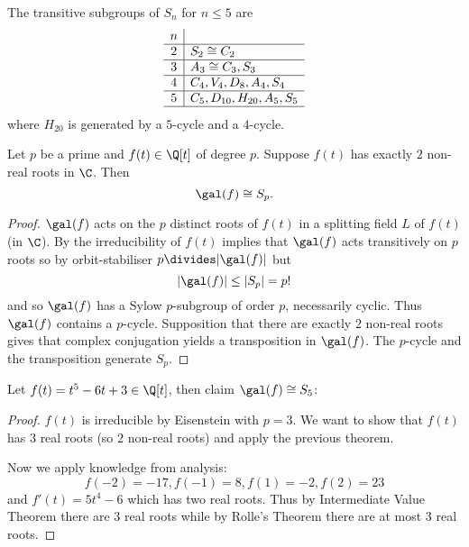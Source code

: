 \documentclass[a4paper]{article}
\begin{document}
\begin{lemma}
  \label{lem:transitive subgroups of Sn}
  The transitive subgroups of \(S_n\) for \(n \leq 5\) are
  \[
  \begin{array}[h]{c|l}
    n & \\ \hline
    2 & S_2 \cong C_2 \\ \hline
    3 & A_3 \cong C_3, S_3 \\ \hline
    4 & C_4, V_4, D_8, A_4, S_4 \\ \hline
    5 & C_5, D_{10}, H_{20}, A_5, S_5 \\ \hline
  \end{array}
  \]
  where \(H_{20}\) is generated by a \(5\)-cycle and a \(4\)-cycle.
\end{lemma}

\begin{theorem}
  \label{thm:galois group Sp}
  Let \(p\) be a prime and \(f(t) \in \Q[t]\) of degree \(p\). Suppose \(f(t)\) has exactly \(2\) non-real roots in \(\C\). Then
  \[
    \gal(f) \cong S_p.
  \]
\end{theorem}

\begin{proof}
  \(\gal(f)\) acts on the \(p\) distinct roots of \(f(t)\) in a splitting field \(L\) of \(f(t)\) (in \(\C\)). By  the irreducibility of \(f(t)\) implies that \(\gal(f)\) acts transitively on \(p\) roots so by orbit-stabiliser \(p \divides |\gal(f)|\) but
  \[
    |\gal(f)| \leq |S_p| = p!
  \]
  and so \(\gal(f)\) has a Sylow \(p\)-subgroup of order \(p\), necessarily cyclic. Thus \(\gal(f)\) contains a \(p\)-cycle. Supposition that there are exactly \(2\) non-real roots gives that complex conjugation yields a transposition in \(\gal(f)\). The \(p\)-cycle and the transposition generate \(S_p\).
\end{proof}

\begin{eg}
  Let \(f(t) = t^5 - 6t + 3 \in \Q[t]\), then claim \(\gal(f) \cong S_5\):

  \begin{proof}
    \(f(t)\) is irreducible by Eisenstein with \(p = 3\). We want to show that \(f(t)\) has \(3\) real roots (so \(2\) non-real roots) and apply the previous theorem.

    Now we apply knowledge from analysis:
    \[
      f(-2) = -17, f(-1) = 8, f(1) = -2, f(2) = 23
    \]
    and \(f'(t) = 5t^4 - 6\) which has two real roots. Thus by Intermediate Value Theorem there are \(3\) real roots while by Rolle's Theorem there are at most \(3\) real roots.
  \end{proof}
\end{eg}
\end{document}
